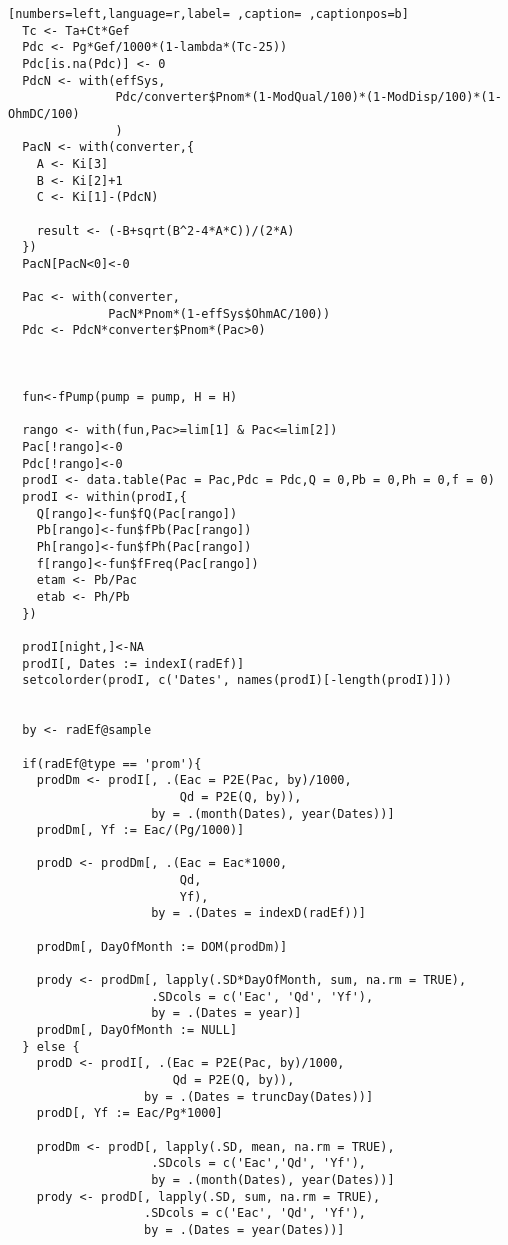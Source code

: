 \begin{lstlisting}[numbers=left,language=r,label= ,caption= ,captionpos=b]
  Tc <- Ta+Ct*Gef
  Pdc <- Pg*Gef/1000*(1-lambda*(Tc-25))
  Pdc[is.na(Pdc)] <- 0 
  PdcN <- with(effSys,
               Pdc/converter$Pnom*(1-ModQual/100)*(1-ModDisp/100)*(1-OhmDC/100)
               )
  PacN <- with(converter,{
    A <- Ki[3]
    B <- Ki[2]+1
    C <- Ki[1]-(PdcN)
    
    result <- (-B+sqrt(B^2-4*A*C))/(2*A)
  })
  PacN[PacN<0]<-0
  
  Pac <- with(converter,
              PacN*Pnom*(1-effSys$OhmAC/100))
  Pdc <- PdcN*converter$Pnom*(Pac>0)
  
  

  fun<-fPump(pump = pump, H = H)
  
  rango <- with(fun,Pac>=lim[1] & Pac<=lim[2]) 
  Pac[!rango]<-0
  Pdc[!rango]<-0
  prodI <- data.table(Pac = Pac,Pdc = Pdc,Q = 0,Pb = 0,Ph = 0,f = 0)	
  prodI <- within(prodI,{
    Q[rango]<-fun$fQ(Pac[rango])
    Pb[rango]<-fun$fPb(Pac[rango])
    Ph[rango]<-fun$fPh(Pac[rango])
    f[rango]<-fun$fFreq(Pac[rango])
    etam <- Pb/Pac
    etab <- Ph/Pb
  })
  
  prodI[night,]<-NA
  prodI[, Dates := indexI(radEf)]
  setcolorder(prodI, c('Dates', names(prodI)[-length(prodI)]))
  
  
  by <- radEf@sample
  
  if(radEf@type == 'prom'){
    prodDm <- prodI[, .(Eac = P2E(Pac, by)/1000,
                        Qd = P2E(Q, by)),
                    by = .(month(Dates), year(Dates))]
    prodDm[, Yf := Eac/(Pg/1000)]

    prodD <- prodDm[, .(Eac = Eac*1000,
                        Qd,
                        Yf),
                    by = .(Dates = indexD(radEf))]

    prodDm[, DayOfMonth := DOM(prodDm)]
    
    prody <- prodDm[, lapply(.SD*DayOfMonth, sum, na.rm = TRUE),
                    .SDcols = c('Eac', 'Qd', 'Yf'),
                    by = .(Dates = year)]
    prodDm[, DayOfMonth := NULL]
  } else {
    prodD <- prodI[, .(Eac = P2E(Pac, by)/1000,
                       Qd = P2E(Q, by)),
                   by = .(Dates = truncDay(Dates))]
    prodD[, Yf := Eac/Pg*1000]

    prodDm <- prodD[, lapply(.SD, mean, na.rm = TRUE),
                    .SDcols = c('Eac','Qd', 'Yf'),
                    by = .(month(Dates), year(Dates))]
    prody <- prodD[, lapply(.SD, sum, na.rm = TRUE),
                   .SDcols = c('Eac', 'Qd', 'Yf'),
                   by = .(Dates = year(Dates))]
    

\end{lstlisting}
